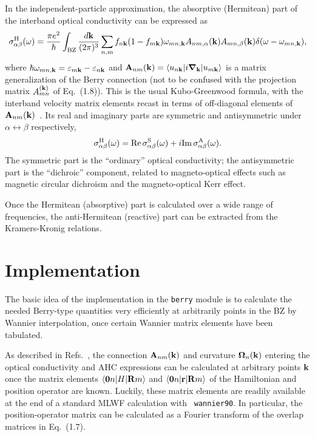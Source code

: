 In the independent-particle approximation, the absorptive (Hermitean)
part of the interband optical conductivity can be expressed as
%
$$
\sigma^{\rm H}_{\alpha\beta}(\omega)=\frac{\pi e^2}{\hbar}
\int_{\rm BZ}\frac{d{\bf
    k}}{(2\pi)^3}\sum_{n,m}f_{n{\bf k}}(1-f_{m{\bf k}})\omega_{mn,\bf k}
A_{nm,\alpha}({\bf k})A_{mn,\beta}({\bf k})
\delta(\omega-\omega_{mn,\bf k}),
$$
%
where $\hbar\omega_{mn,\bf k}=\varepsilon_{m{\bf
    k}}-\varepsilon_{n{\bf k}}$ and $ {\bf A}_{nm}({\bf k})=\langle
u_{n{\bf k}}\vert i\bm{\nabla}_{\bf k}\vert u_{m{\bf k}}\rangle$ is a
matrix generalization of the Berry connection (not to be confused with
the projection matrix $A^{({\bf k})}_{mn}$ of Eq.~(1.8)).  This is the
usual Kubo-Greenwood formula, with the interband velocity matrix
elements recast in terms of off-diagonal elements of ${\bf
  A}_{nm}({\bf k})$~\cite{blount}. Its real and imaginary parts are
symmetric and antisymmetric under $\alpha\leftrightarrow\beta$
respectively,
%
$$
\sigma^{\rm H}_{\alpha\beta}(\omega)={\rm Re}\,\sigma^{\rm S}_{\alpha\beta}(\omega)+
i{\rm Im}\, \sigma^{\rm A}_{\alpha\beta}(\omega).
$$
%
The symmetric part is the ``ordinary'' optical conductivity; the
antisymmetric part is the ``dichroic'' component, related to
magneto-optical effects such as magnetic circular dichroism and the
magneto-optical Kerr effect.

Once the Hermitean (absorptive) part is calculated over a wide range
of frequencies, the anti-Hermitean (reactive) part can be extracted
from the Kramers-Kronig relations.

\section{Implementation}

The basic idea of the implementation in the {\tt berry} module is to
calculate the needed Berry-type quantities very efficiently at
arbitrarily points in the BZ by Wannier interpolation, once certain
Wannier matrix elements have been tabulated.

As described in Refs.~\cite{wang-prb06,yates-prb07}, the connection
${\bf A}_{nm}({\bf k})$ and curvature $\bm{\Omega}_n({\bf k})$
entering the optical conductivity and AHC expressions can be
calculated at arbitrary points ${\bf k}$ once the matrix elements
$\langle {\bf 0}n\vert H\vert {\bf R}m\rangle$ and $\langle {\bf
  0}n\vert {\bf r}\vert {\bf R}m\rangle$ of the Hamiltonian and
position operator are known.  Luckily, these matrix elements are
readily available at the end of a standard MLWF calculation with {\tt
  wannier90}. In particular, the position-operator matrix can be
calculated as a Fourier transform of the overlap matrices in
Eq.~(1.7).


